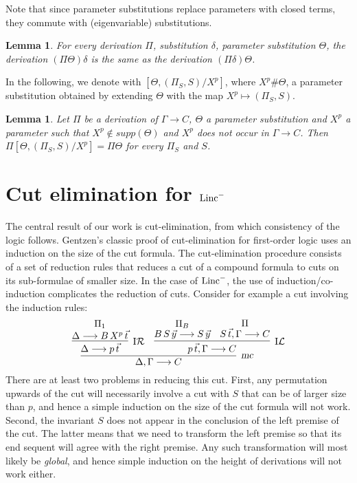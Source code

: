 \documentclass[preprint]{elsarticle}
\newcommand{\Linc}{{\rm Linc}^-}
\newcommand{\Seq}[2]{#1\longrightarrow #2}
\newcommand{\indR}{{\rm I}{\cal R}}
\newcommand{\indL}{{\rm I}{\cal L}}
\newcommand{\mc}{\hbox{\sl mc}}
\newtheorem{lemma}[thm]{Lemma}
\begin{document}
Note that since parameter substitutions replace parameters with closed
terms, they commute with (eigenvariable) substitutions.

\begin{lemma}
  \label{lm:param subst commutes}
  For every derivation $\Pi$, substitution $\delta$, parameter
  substitution $\Theta$, the derivation $(\Pi\Theta)\delta$ is the
  same as the derivation $(\Pi\delta)\Theta$.
\end{lemma}

In the following, we denote with $[\Theta, (\Pi_S,S)/X^p]$, where $X^p
\# \Theta$, a parameter substitution obtained by extending $\Theta$
with the map $X^p \mapsto (\Pi_S,S)$.

\begin{lemma}
  \label{lm:param subst vacuous}
  Let $\Pi$ be a derivation of $\Seq \Gamma C$, $\Theta$  a
  parameter substitution and  $X^p$  a parameter such that $X^p
  \not \in supp(\Theta)$ and $X^p$ does not occur in $\Seq \Gamma C$.
  Then $\Pi[\Theta, (\Pi_S,S)/X^p] = \Pi\Theta$ for every $\Pi_S$ and
  $S$.
\end{lemma}


\section{Cut elimination for $\Linc$}
\label{sec:cut-elim}

The central result of our work is cut-elimination, from which
consistency of the logic follows.  Gentzen's classic proof of
cut-elimination for first-order logic uses an induction on the size of
the cut formula. The cut-elimination procedure consists of a set of reduction
rules that reduces a cut of a compound formula to cuts on its
sub-formulae of smaller size.  In the case of $\Linc$, the use of
induction/co-induction complicates the reduction of cuts.  Consider
for example a cut involving the induction rules:
$$
\infer[\mc] {\Seq{\Delta, \Gamma}{C} } { \infer[\indR]
  {\Seq{\Delta}{p\,\vec t}} { \deduce{\Seq{\Delta}{B\,X^p\,\vec t}}{\Pi_1} } &
  \infer[\indL] {\Seq{p\,\vec t, \Gamma}{C}} {
    \deduce{\Seq{B\,S\,\vec y}{S\,\vec y}}{\Pi_B} & \deduce{\Seq{S\,\vec t,
        \Gamma}{C}}{\Pi} } }
$$
There are at least two problems in reducing this cut. First, any
permutation upwards of the cut will necessarily involve a cut with $S$
that can be of larger size than $p$, and hence a simple induction on
the size of the cut formula will not work.  Second, the invariant $S$ does
not appear in the conclusion of the left premise of the cut. The
latter means that we need to transform the left premise so that its
end sequent will agree with the right premise. Any such transformation
will most likely be \emph{global}, and hence simple induction on the
height of derivations will not work either.
\end{document}
